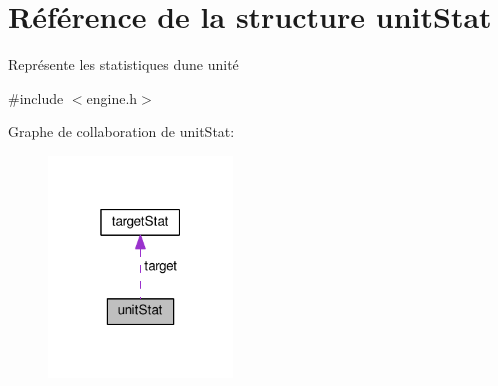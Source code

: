 \hypertarget{structunitStat}{}\section{Référence de la structure unit\+Stat}
\label{structunitStat}


Représente les statistiques d\textquotesingle{}une unité  




{\ttfamily \#include $<$engine.\+h$>$}



Graphe de collaboration de unit\+Stat\+:\nopagebreak
\begin{figure}[H]
\begin{center}
\leavevmode
\includegraphics[width=139pt]{structunitStat__coll__graph}
\end{center}
\end{figure}
